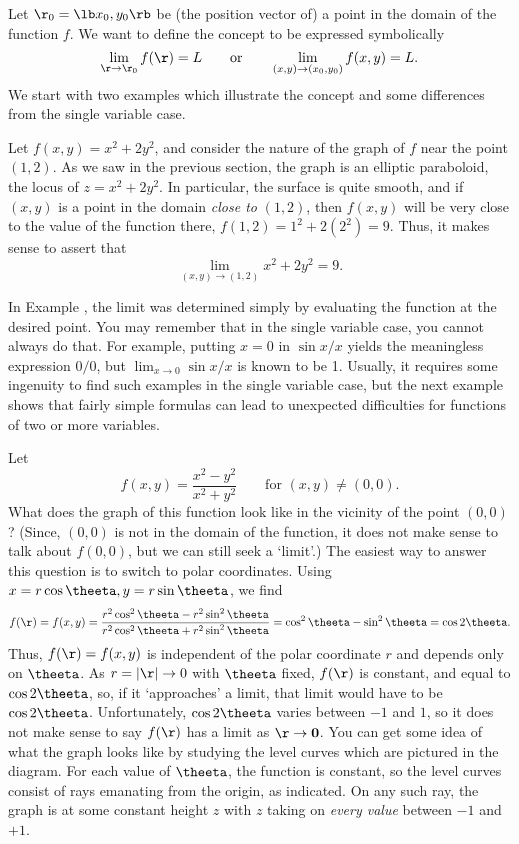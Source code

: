 Let  $\r_0 = \lb x_0, y_0 \rb$ be (the position vector of) a point
in the domain of the function $f$.   We want to define the
concept to be expressed symbolically
$$
    \lim_{\r \to \r_0} f(\r) = L \qquad\text{or}\qquad 
   \lim_{(x,y)\to (x_0,y_0)} f(x,y) = L.
$$
%
We start with two examples which illustrate the concept and some
differences from the single variable case.

\nextex
\xdef\ExOne{\en}
  Let $f(x,y) = x^2 + 2y^2$, and consider the
nature of the graph of $f$  near the point $(1,2)$.  As
we saw in the previous section, the graph is an elliptic paraboloid,
the locus of $z = x^2 + 2y^2$.
In particular, the surface is quite smooth, and if $(x,y)$ is
a point in the domain {\it close to\/} $(1,2)$, then $f(x,y)$
will be very close to the value of the function there, $f(1,2) =
1^2 + 2(2^2) = 9$.   Thus, it makes sense to assert that
$$
 \lim_{(x,y)\to (1,2)} x^2 + 2y^2 = 9.
$$
\endexample

In Example \en, the limit was determined simply by evaluating the
function at the desired point.  You may remember that in the single
variable case, you cannot always do that.
For example, putting $x = 0$ in  $\sin x/x$ yields the meaningless
expression $0/0$, but $\lim_{x \to 0} \sin x/x$ is known to be 1.
Usually, it requires some ingenuity to find such examples in the single
variable case, but the next example shows that fairly simple formulas
can lead to unexpected difficulties for functions of two or more
variables.

\nextex
{}  Let
$$
   f(x,y) = \frac{x^2 - y^2}{x^2 + y^2}\qquad\text{for } (x,y) \not= (0,0).
$$
 What does the graph of this function look like in the vicinity
of the point $(0,0)$?   (Since, $(0,0)$ is not in the domain of
the function, it does not make sense  to talk about
$f(0,0)$, but we can still seek a `limit'.)  The easiest way to
answer this question is to switch to polar coordinates.   Using
$x = r\cos\theeta, y = r\sin\theeta$, we find
$$
f(\r) = f(x,y) = \frac{r^2\cos^2\theeta - r^2\sin^2\theeta}
{r^2\cos^2\theeta + r^2\sin^2\theeta} = \cos^2\theeta - \sin^2\theeta
 = \cos 2\theeta.
$$
Thus, $f(\r) = f(x,y)$
is independent of the polar coordinate $r$ and depends only
on $\theeta$.  As $r = |\r| \to 0$ with $\theeta$ fixed, $f(\r)$
is constant, and equal to $\cos 2\theeta$, so, if  it `approaches'
a limit, that limit would have to be $\cos 2\theeta$.  
Unfortunately, $\cos 2\theeta$ varies between $-1$ and $1$, so it
does not make sense to say $f(\r)$ has a limit as $\r \to \bold 0$.
You can get some idea of what the graph looks like by studying the
level curves which are pictured in the diagram.  For each value
of $\theeta$, the function is constant, so the level curves consist
of rays emanating from the origin, as indicated.  On any such
ray, the graph is at some constant height $z$ with $z$ taking on
{\it every value\/} between $-1$ and $+1$.
\endexample

